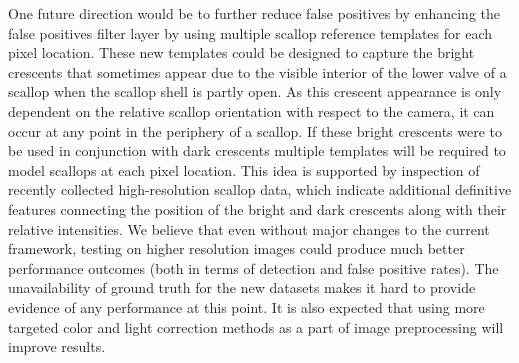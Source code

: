 \documentclass {udthesis}
\begin{document}
One future direction would be to further reduce false positives by enhancing the false positives filter layer by using multiple scallop reference templates for each pixel location. 
These new templates could be designed to capture the bright crescents that sometimes appear due to the visible interior of the lower valve of a scallop when the scallop shell is partly open. As this crescent appearance is only dependent on the relative scallop orientation with respect to the camera, it can occur at any point in the periphery of a scallop. If these bright crescents were to be used in conjunction with dark crescents multiple templates will be required to model scallops at each pixel location.
This idea is supported by inspection of recently collected high-resolution scallop data, which indicate additional definitive features connecting the position of the bright and dark crescents along with their relative intensities. 
We believe that even without major changes to the current framework, testing on higher resolution images could produce much better performance outcomes (both in terms of detection and false positive rates). 
The unavailability of ground truth for the new datasets makes it hard to provide evidence of any performance at this point. 
It is also expected that using more targeted color and light correction methods \cite{dawkings13} as a part of image preprocessing will improve results.


\printglossary[type=\acronymtype]                  
\end{document}
